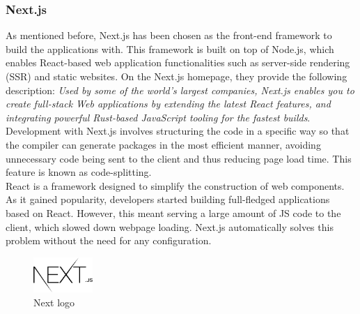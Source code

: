 \documentclass[../memory.tex]{subfiles}
\begin{document}
\subsubsection{Next.js}
As mentioned before, Next.js has been chosen as the front-end framework to build
the applications with. This framework is built on top of Node.js, which enables
React-based web application functionalities such as server-side rendering (SSR)
and static websites. On the Next.js homepage, they provide the following
description: \emph{Used by some of the world's largest companies, Next.js
	enables you to create full-stack Web applications by extending the latest React
	features, and integrating powerful Rust-based JavaScript tooling for the fastest
	builds}\cite{nextjs}.
\\[8pt]
Development with Next.js involves structuring the code in a specific way so
that the compiler can generate packages in the most efficient manner,
avoiding unnecessary code being sent to the client and thus reducing page
load time. This feature is known as code-splitting.
\\
React is a framework designed to simplify the construction of web components. As
it gained popularity, developers started building full-fledged applications
based on React. However, this meant serving a large amount of JS code to the
client, which slowed down webpage loading. Next.js automatically solves this
problem without the need for any configuration.
\begin{figure}[H]
	\centering
	\includegraphics[width=0.2\textwidth]{./assets/logos/next-logo.png}
	\caption{Next logo}
\end{figure}
\end{document}
